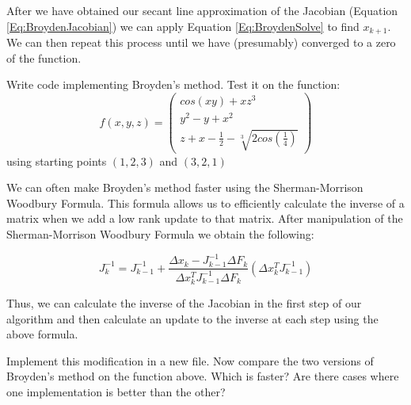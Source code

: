 After we have obtained our secant line approximation of the Jacobian (Equation \ref{Eq:BroydenJacobian}) we can apply Equation \ref{Eq:BroydenSolve} to find $x_{k+1}$. We can then repeat this process until we have (presumably) converged to a zero of the function. 
% 
% 
% 

\begin{problem}
Write code implementing Broyden's method. Test it on the function:
\[
f(x,y,z) = 
 \left( \begin{array}{ccc}
cos(xy)+ xz^3 \\
y^2 - y + x^2 \\
z + x-\frac{1}{2}-\sqrt[3]{2cos(\frac{1}{4})} \end{array} \right)
\]
using starting points $(1,2,3)$ and $(3,2,1)$
\end{problem}

We can often make Broyden's method faster using the Sherman-Morrison Woodbury Formula. This formula allows us to efficiently calculate the inverse of a matrix when we add a low rank update to that matrix. After manipulation of the Sherman-Morrison Woodbury Formula we obtain the following:

\[
J_k^{-1} = J_{k-1}^{-1} + \frac{\Delta x_k - J_{k-1}^{-1}\Delta F_k}{\Delta x_k^T J_{k-1}^{-1}\Delta F_k} (\Delta x_k^T J_{k-1}^{-1})
\]

Thus, we can calculate the inverse of the Jacobian in the first step of our algorithm and then calculate an update to the inverse at each step using the above formula.

\begin{problem}
Implement this modification in a new file. Now compare the two versions of Broyden's method on the function above. Which is faster? Are there cases where one implementation is better than the other?
\end{problem}
